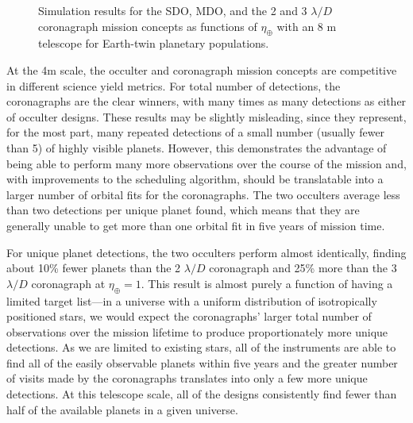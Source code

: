 \begin{figure}[ht]
\begin{center}
\begin{tabular}{c c}
  \end{tabular}
 \end{center}
 \caption[8 m telescope comparison]{ \label{fig:compinsts8m} Simulation results for the SDO, MDO, and the 2 and 3 $\lambda/D$ coronagraph mission concepts as functions of $\eta_\oplus$ with an 8 m telescope for Earth-twin planetary populations.}
 \end{figure}
 
 At the 4m scale, the occulter and coronagraph mission concepts are competitive in different science yield metrics.  For total number of detections, the coronagraphs are the clear winners, with many times as many detections as either of occulter designs.  These results may be slightly misleading, since they represent, for the most part, many repeated detections of a small number (usually fewer than 5) of highly visible planets.  However, this demonstrates the advantage of being able to perform many more observations over the course of the mission and, with improvements to the scheduling algorithm, should be translatable into a larger number of orbital fits for the coronagraphs.  The two occulters average less than two detections per unique planet found, which means that they are generally unable to get more than one orbital fit in five years of mission time.

For unique planet detections, the two occulters perform almost identically, finding about 10\% fewer planets than the 2 $\lambda/D$ coronagraph and 25\% more than the 3 $\lambda/D$ coronagraph at $\eta_\oplus = 1$.  This result is almost purely a function of having a limited target list---in a universe with a uniform distribution of isotropically positioned stars, we would expect the coronagraphs' larger total number of observations over the mission lifetime to produce proportionately more unique detections.  As we are limited to existing stars, all of the instruments are able to find all of the easily observable planets within five years and the greater number of visits made by the coronagraphs translates into only a few more unique detections. At this telescope scale, all of the designs consistently find fewer than half of the available planets in a given universe.  
 
